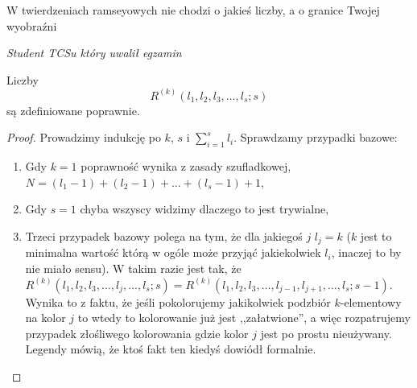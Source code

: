 \epigraph{W twierdzeniach ramseyowych nie chodzi o jakieś liczby, a o granice Twojej wyobraźni}{\textit{Student TCSu który uwalił egzamin}}
  \label{ramsey}
 
 \begin{theorem}
            Liczby
    \begin{equation*}
         R^{(k)}(l_1,l_2,l_3,\dots,l_s;s)
    \end{equation*}
    są zdefiniowane poprawnie. 
    \end{theorem}

    \begin{proof}
        Prowadzimy indukcję po $k$, $s$ i $\sum_{i=1}^{s} l_i$. Sprawdzamy przypadki bazowe:
        \begin{enumerate}
            \item Gdy $k = 1$ poprawność wynika z zasady szufladkowej, $N = (l_1 - 1) + (l_2 - 1) + \dots + (l_s - 1) + 1$,
            \item Gdy $s = 1$ chyba wszyscy widzimy dlaczego to jest trywialne,
            \item Trzeci przypadek bazowy polega na tym, że dla jakiegoś $j$ $l_j = k$ ($k$ jest to minimalna wartość którą w ogóle może przyjąć jakiekolwiek $l_i$, inaczej to by nie miało sensu). W takim razie jest tak, że $R^{(k)}(l_1,l_2,l_3,\dots,l_j,\dots,l_s;s) = R^{(k)}(l_1,l_2,l_3,\dots,l_{j-1}, l_{j+1}, \dots,l_s;s-1)$. Wynika to z faktu, że jeśli pokolorujemy jakikolwiek podzbiór $k$-elementowy na kolor $j$ to wtedy to kolorowanie już jest ,,załatwione'', a więc rozpatrujemy przypadek złośliwego kolorowania gdzie kolor $j$ jest po prostu nieużywany. Legendy mówią, że ktoś fakt ten kiedyś dowiódł formalnie.
        \end{enumerate}


\end{proof}
